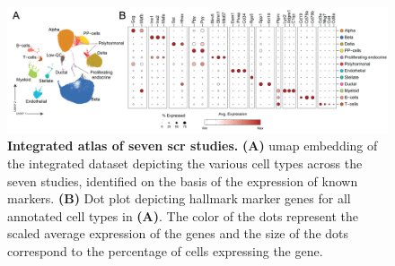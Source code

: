 



\begin{figure}[b!]
\centering
\includegraphics[width=\linewidth]{Chapter5/Fig/F3-2-v2-01.png}
\caption[Integrated atlas of seven  studies]{\textbf{Integrated atlas of seven \gls{scr} studies.} \textbf{(A)} \gls{umap} embedding of the integrated dataset depicting the various cell types across the seven studies, identified on the basis of the expression of known markers. \textbf{(B)} Dot plot depicting hallmark marker genes for all annotated cell types in \textbf{(A)}. The color of the dots represent the scaled average expression of the genes and the size of the dots correspond to the percentage of cells expressing the gene.}
\label{fig:chp3_fulldata}
\end{figure}

